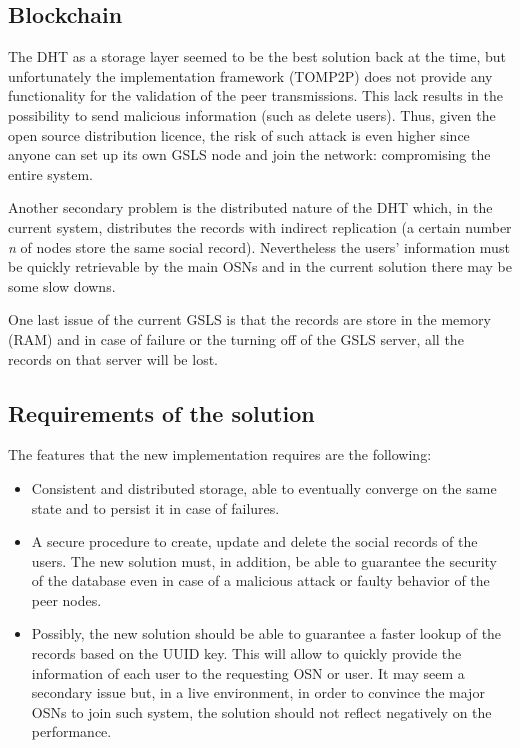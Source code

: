 \subsection{Blockchain}

The DHT as a storage layer seemed to be the best solution back at the time, but unfortunately the implementation framework (TOMP2P) does not provide any functionality for the validation of the peer transmissions. 
This lack results in the possibility to send malicious information (such as delete users).
Thus, given the open source distribution licence, the risk of such attack is even higher since anyone can set up its own GSLS node and join the network: compromising the entire system. \par

Another secondary problem is the distributed nature of the DHT which, in the current system, distributes the records with indirect replication \cite{_tomp2p_2017} (a certain number \textit{n} of nodes store the same social record). Nevertheless the users' information must be quickly retrievable by the main OSNs and in the current solution there may be some slow downs. \par

One last issue of the current GSLS is that the records are store in the memory (RAM) and in case of failure or the turning off of the GSLS server, all the records on that server will be lost. \par

\subsection{Requirements of the solution}
The features that the new implementation requires are the following:
\begin{itemize}
  \item Consistent and distributed storage, able to eventually converge on the same state and to persist it in case of failures.
  \item A secure procedure to create, update and delete the social records of the users. The new solution must, in addition, be able to guarantee the security of the database even in case of a malicious attack or faulty behavior of the peer nodes.
  \item Possibly, the new solution should be able to guarantee a faster lookup of the records based on the UUID key. This will allow to quickly provide the information of each user to the requesting OSN or user. It may seem a secondary issue but, in a live environment, in order to convince the major OSNs to join such system, the solution should not reflect negatively on the performance.
\end{itemize}

